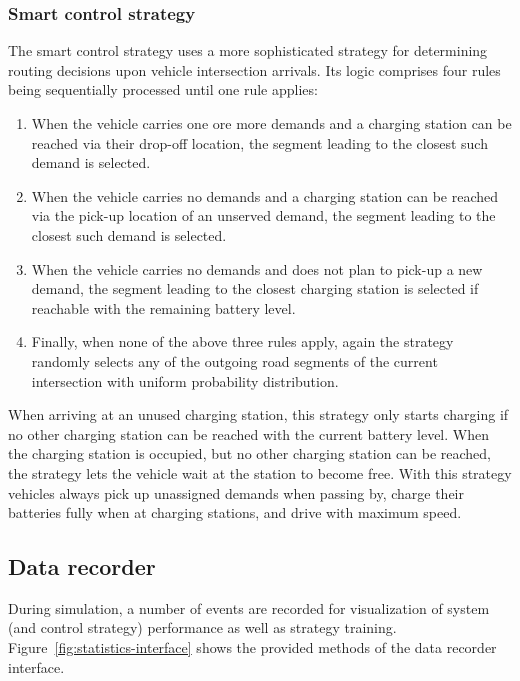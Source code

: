 \documentclass[a4paper,twoside]{article}
\begin{document}
	\subsubsection*{Smart control strategy}
	\label{sec:controller-smart}
	The smart control strategy uses a more sophisticated strategy for determining routing decisions upon vehicle intersection arrivals.
	Its logic comprises four rules being sequentially processed until one rule applies:
	\begin{enumerate}
		\item When the vehicle carries one ore more demands and a charging station can be reached via their drop-off location, the segment leading to the closest such demand is selected.
		\item When the vehicle carries no demands and a charging station can be reached via the pick-up location of an unserved demand, the segment leading to the closest such demand is selected.
		\item When the vehicle carries no demands and does not plan to pick-up a new demand, the segment leading to the closest charging station is selected if reachable with the remaining battery level.
		\item Finally, when none of the above three rules apply, again the strategy randomly selects any of the outgoing road segments of the current intersection with uniform probability distribution.
	\end{enumerate}
	When arriving at an unused charging station, this strategy only starts charging if no other charging station can be reached with the current battery level.
	When the charging station is occupied, but no other charging station can be reached, the strategy lets the vehicle wait at the station to become free.
	With this strategy vehicles always pick up unassigned demands when passing by, charge their batteries fully when at charging stations, and drive with maximum speed.
	
	\subsection{Data recorder}
	\label{sec:statistics-interface}
	
	During simulation, a number of events are recorded for visualization of system (and control strategy) performance as well as strategy training.
	Figure~\ref{fig:statistics-interface} shows the provided methods of the data recorder interface.
	
\end{document}
